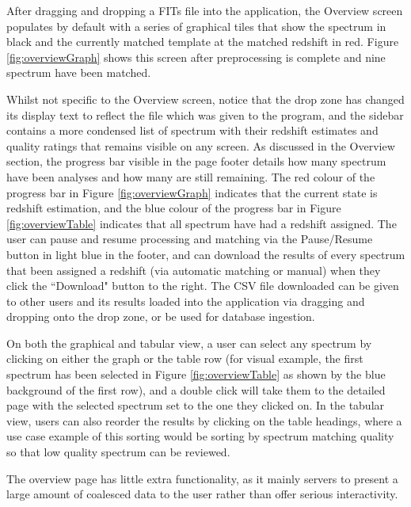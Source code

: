\documentclass[titlesmallcaps, examinerscopy, copyrightpage]{uqthesis}
\begin{document}
After dragging and dropping a FITs file into the application, the Overview screen populates by default with a series of graphical tiles that show the spectrum in black and the currently matched template at the matched redshift in red. Figure \ref{fig:overviewGraph} shows this screen after preprocessing is complete and nine spectrum have been matched.

Whilst not specific to the Overview screen, notice that the drop zone has changed its display text to reflect the file which was given to the program, and the sidebar contains a more condensed list of spectrum with their redshift estimates and quality ratings that remains visible on any screen. As discussed in the Overview section, the progress bar visible in the page footer details how many spectrum have been analyses and how many are still remaining. The red colour of the progress bar in Figure \ref{fig:overviewGraph} indicates that the current state is redshift estimation, and the blue colour of the progress bar in Figure \ref{fig:overviewTable} indicates that all spectrum have had a redshift assigned. The user can pause and resume processing and matching via the Pause/Resume button in light blue in the footer, and can download the results of every spectrum that been assigned a redshift (via automatic matching or manual) when they click the ``Download" button to the right. The CSV file downloaded can be given to other users and its results loaded into the application via dragging and dropping onto the drop zone, or be used for database ingestion.

On both the graphical and tabular view, a user can select any spectrum by clicking on either the graph or the table row (for visual example, the first spectrum has been selected in Figure \ref{fig:overviewTable} as shown by the blue background of the first row), and a double click will take them to the detailed page with the selected spectrum set to the one they clicked on. In the tabular view, users can also reorder the results by clicking on the table headings, where a use case example of this sorting would be sorting by spectrum matching quality so that low quality spectrum can be reviewed.

The overview page has little extra functionality, as it mainly servers to present a large amount of coalesced data to the user rather than offer serious interactivity. 
\end{document}

